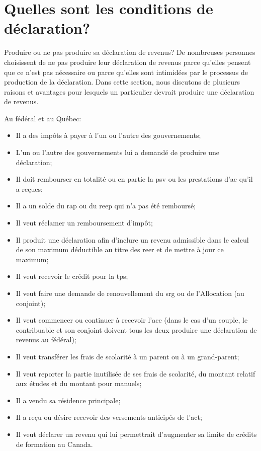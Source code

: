 \section{Quelles sont les conditions de déclaration?}
\begin{intro}
	Produire ou ne pas produire sa déclaration de revenus? De nombreuses personnes choisissent de ne pas produire leur déclaration de revenus parce qu'elles pensent que ce n'est pas nécessaire ou parce qu'elles sont intimidées par le processus de production de la déclaration. Dans cette section, nous discutons de plusieurs raisons et avantages pour lesquels un particulier devrait produire une déclaration de revenus.
\end{intro}
Au fédéral et au Québec:
\caqc
\begin{itemize}
	\item Il a des impôts à payer à l'un ou l'autre des gouvernements;
	\item L'un ou l'autre des gouvernements lui a demandé de produire une déclaration;
	\item Il doit rembourser en totalité ou en partie la \acrfull{psv} ou les prestations d'\acrfull{ae} qu'il a reçues;
	\item Il a un solde du \acrfull{rap} ou du \acrfull{reep} qui n'a pas été remboursé;
	\item Il veut réclamer un remboursement d'impôt;
	\item Il produit une déclaration afin d'inclure un revenu admissible dans le calcul de son maximum déductible au titre des \acrshort{reer} et de mettre à jour ce maximum;
	\item Il veut recevoir le crédit pour la \acrshort{tps};
	\item Il veut faire une demande de renouvellement du \acrfull{srg} ou de l'Allocation (au conjoint);
	\item Il veut commencer ou continuer à recevoir l'\acrfull{ace} (dans le cas d'un couple, le contribuable et son conjoint doivent tous les deux produire une déclaration de revenus au fédéral);
	\item Il veut transférer les frais de scolarité à un parent ou à un grand-parent;
	\item Il veut reporter la partie inutilisée de ses frais de scolarité, du montant relatif aux études et du montant pour manuels;
	\item Il a vendu sa résidence principale;
	\item Il a reçu ou désire recevoir des versements anticipés de l'\acrfull{act};
	\item Il veut déclarer un revenu qui lui permettrait d'augmenter sa limite de crédits de formation au Canada.
\end{itemize}

